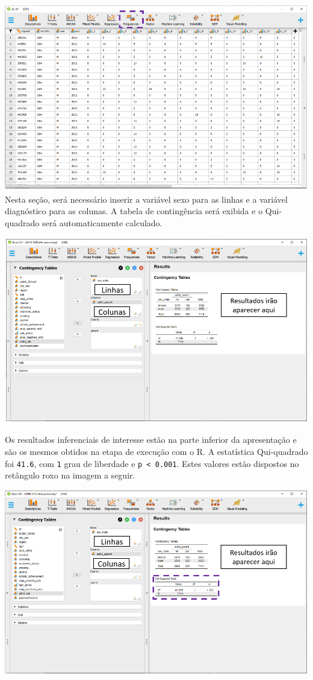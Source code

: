\documentclass[
]{book}
\begin{document}
\includegraphics{./img/cap_x2_interface.png}
Nesta seção, será necessário inserir a variável sexo para as linhas e a variável diagnóstico para as colunas. A tabela de contingência será exibida e o Qui-quadrado será automaticamente calculado.

\includegraphics{./img/cap_x2_resultados.png}

Os resultados inferenciais de interesse estão na parte inferior da apresentação e são os mesmos obtidos na etapa de execução com o R. A estatística Qui-quadrado foi \texttt{41.6}, com \texttt{1} grau de liberdade e \texttt{p\ \textless{}\ 0.001}. Estes valores estão dispostos no retângulo roxo na imagem a seguir.

\includegraphics{./img/cap_x2_resultados2.png}
\end{document}
